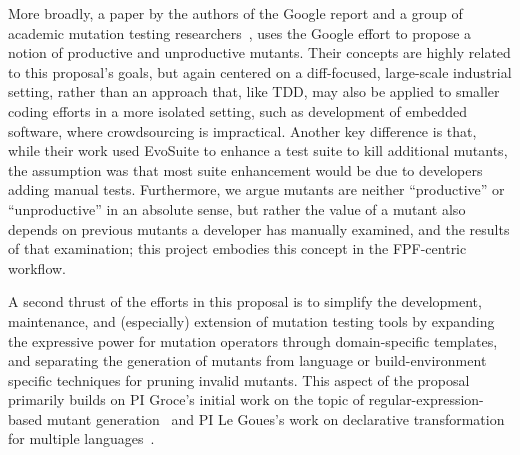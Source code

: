 More broadly, a paper by the
authors of the Google report and a group of academic mutation testing
researchers~\cite{ivankovic2018industrial}, uses the Google effort to
propose a notion of productive and unproductive mutants.  Their
concepts are highly related to this proposal's goals, but again centered on a
diff-focused, large-scale industrial setting, rather than an approach
that, like TDD, may also be applied to smaller coding efforts in a more
isolated setting, such as development of embedded software, where
crowdsourcing is impractical.  Another key difference is that, while their
work used EvoSuite to enhance a test suite to kill additional mutants,
the assumption was that most suite enhancement would be due to
developers adding manual tests.  Furthermore, we argue mutants
are neither ``productive'' or ``unproductive'' in an absolute sense, but
rather the value of a mutant also depends on previous mutants a
developer has manually examined, and the results of that examination;
this project embodies this concept in the FPF-centric workflow.

A second thrust of the efforts in this proposal is to simplify the
development, maintenance, and (especially) extension of mutation
testing tools by
expanding the expressive power for
mutation operators through domain-specific templates, and separating the generation of mutants from
language or build-environment specific techniques for pruning invalid
mutants.  This aspect of the proposal primarily builds on PI Groce's initial work on the topic of
regular-expression-based mutant generation~\cite{regexpMut} and
PI Le Goues's work on declarative transformation for multiple languages~\cite{rvt-ppc}.
